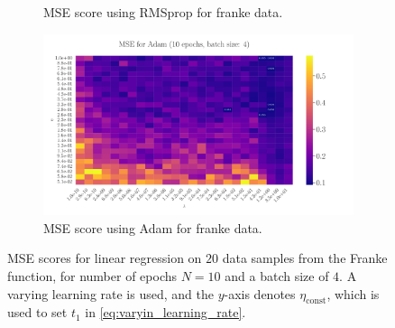 \documentclass[%
reprint,s
amsmath,amssymb,
aps,
]{revtex4-2}
\begin{document}
\begin{figure}
\begin{subfigure}{0.41\textwidth}
		\caption{MSE score using RMSprop for franke data.}
		\label{fig:LinReg25x25_epoch100_bacthS50}
	\end{subfigure}
	\hfill
	\begin{subfigure}{0.41\textwidth}
		\includegraphics[width=\textwidth]{Figures/LinRegAdam_25x25_epoch10_batchS4_zoomed.pdf}
		\caption{MSE score using Adam for franke data.}
		\label{fig:LinReg25x25_epoch100_bacthS50_zoomed}
	\end{subfigure}
	\caption{MSE scores for linear regression on \(20\) data samples from the Franke function, for number of epochs \(N=10\) and a batch size of \(4\). A varying learning rate is used, and the \(y\)-axis denotes \(\eta_{\text{const}}\), which is used to set \(t_1\) in \eqref{eq:varyin_learning_rate}.}
	\label{fig:LinReg}
\end{figure}
\end{document}
